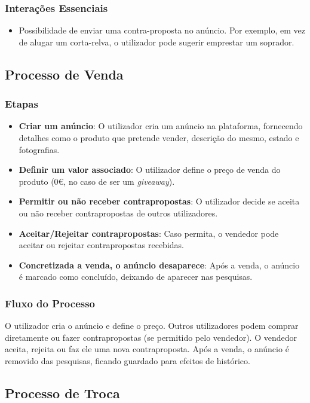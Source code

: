 \documentclass[a4paper, 12pt]{article} %
\begin{document}
\subsubsection{Interações Essenciais}
\begin{itemize}
	\item Possibilidade de enviar uma contra-proposta no anúncio. Por exemplo, em vez de alugar um corta-relva, o utilizador pode sugerir emprestar um soprador.
\end{itemize}

\subsection{Processo de Venda}

\subsubsection{Etapas}
\begin{itemize}
	\item \textbf{Criar um anúncio}: O utilizador cria um anúncio na plataforma, fornecendo detalhes como o produto que pretende vender, descrição do mesmo, estado e fotografias.
	\item \textbf{Definir um valor associado}: O utilizador define o preço de venda do produto (0€, no caso de ser um \textit{giveaway}).
	\item \textbf{Permitir ou não receber contrapropostas}: O utilizador decide se aceita ou não receber contrapropostas de outros utilizadores.
	\item \textbf{Aceitar/Rejeitar contrapropostas}: Caso permita, o vendedor pode aceitar ou rejeitar contrapropostas recebidas.
	\item \textbf{Concretizada a venda, o anúncio desaparece}: Após a venda, o anúncio é marcado como concluído, deixando de aparecer nas pesquisas.
\end{itemize}

\subsubsection{Fluxo do Processo}
O utilizador cria o anúncio e define o preço. Outros utilizadores podem comprar diretamente ou fazer contrapropostas (se permitido pelo vendedor). O vendedor aceita, rejeita ou faz ele uma nova contraproposta. Após a venda, o anúncio é removido das pesquisas, ficando guardado para efeitos de histórico.

\subsection{Processo de Troca}
\end{document}
